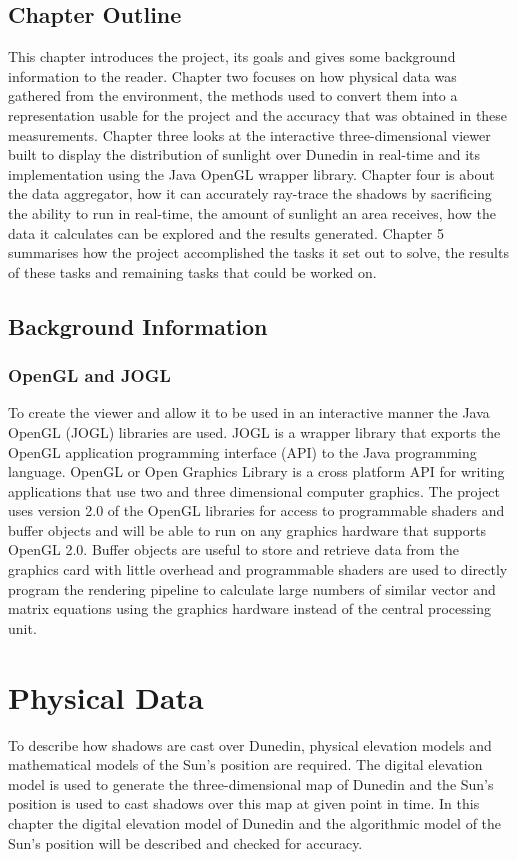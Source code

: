 \documentclass[12pt]{report}
\begin{document}
\section{Chapter Outline}
This chapter introduces the project, its goals and gives some background information to the reader. Chapter two focuses on how physical data was gathered from the environment, the methods used to convert them into a representation usable for the project and the accuracy that was obtained in these measurements. Chapter three looks at the interactive three-dimensional viewer built to display the distribution of sunlight over Dunedin in real-time and its implementation using the Java OpenGL wrapper library\cite{JOGL}. Chapter four is about the data aggregator, how it can accurately ray-trace the shadows by sacrificing the ability to run in real-time, the amount of sunlight an area receives, how the data it calculates can be explored and the results generated. Chapter 5 summarises how the project accomplished the tasks it set out to solve, the results of these tasks and remaining tasks that could be worked on.

\section{Background Information}
\subsection{OpenGL and JOGL} 
To create the viewer and allow it to be used in an interactive manner the Java OpenGL (JOGL)\cite{JOGL} libraries are used. JOGL is a wrapper library that exports the OpenGL application programming interface (API) to the Java programming language. OpenGL or Open Graphics Library is a cross platform API for writing applications that use two and three dimensional computer graphics. The project uses version 2.0 of the OpenGL libraries for access to programmable shaders and buffer objects and will be able to run on any graphics hardware that supports OpenGL 2.0. Buffer objects are useful to store and retrieve data from the graphics card with little overhead and programmable shaders are used to directly program the rendering pipeline to calculate large numbers of similar vector and matrix equations using the graphics hardware instead of the central processing unit.


\chapter{Physical Data}
To describe how shadows are cast over Dunedin, physical elevation models and mathematical models of the Sun's position are required. The digital elevation model is used to generate the three-dimensional map of Dunedin and the Sun's position is used to cast shadows over this map at given point in time. In this chapter the digital elevation model of Dunedin and the algorithmic model of the Sun's position will be described and checked for accuracy.
\end{document}
